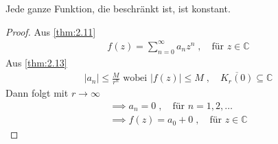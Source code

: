 \begin{theorem}
  Jede ganze Funktion, die beschränkt ist, ist konstant.
  
  \begin{proof}
    Aus \ref{thm:2.11}
    \begin{align*}
      f(z) = \sum\limits_{n=0}^{\infty} a_n z^n \; , \quad \text{für } z \in \mathbb{C}
    \end{align*}
    Aus \ref{thm:2.13}
    \begin{align*}
      |a_n| \leq \frac{M}{r^n} \text{ wobei } |f(z)| \leq M \; , \quad \overline{K_r(0)} \subseteq \mathbb{C}
    \end{align*}
    Dann folgt mit $r \to \infty$
    \begin{gather*}
      \implies a_n = 0 \; , \quad \text{für } n = 1, 2, \ldots \\
      \implies f(z) = a_0 + 0  \; , \quad \text{für } z \in \mathbb{C}
    \end{gather*}
  \end{proof}
\end{theorem}

